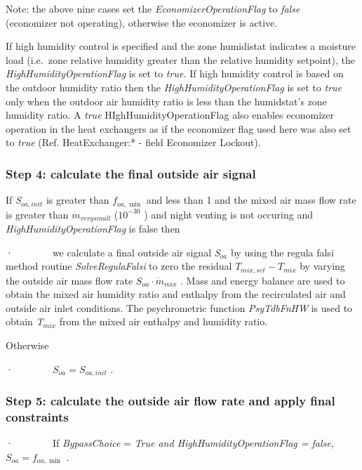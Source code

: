 Note: the above nine cases set the \emph{EconomizerOperationFlag} to \emph{false}~~~~~~ (economizer not operating), otherwise the economizer is active.

If high humidity control is specified and the zone humidistat indicates a moisture load (i.e.~zone relative humidity greater than the relative humidity setpoint), the \emph{HighHumidityOperationFlag} is set to \emph{true.} If high humidity control is based on the outdoor humidity ratio then the \emph{HighHumidityOperationFlag} is set to \emph{true} only when the outdoor air humidity ratio is less than the humidstat's zone humidity ratio. A \emph{true} HIghHumidityOperationFlag also enables economizer operation in the heat exchangers as if the economizer flag used here was also set to \emph{true} (Ref. HeatExchanger:* - field Economizer Lockout).

\subsubsection{Step 4: calculate the final outside air signal}\label{step-4-calculate-the-final-outside-air-signal}

If \emph{S\(_{oa,init}\)} is greater than \({f_{oa,\min }}\) and less than 1 and the mixed air mass flow rate is greater than \({\dot m_{verysmall}}\) (\({10^{ - 30}}\) ) and night venting is not occuring and \emph{HighHumidityOperationFlag} is false then

·~~~~~~~~we calculate a final outside air signal \emph{S\(_{oa}\)} by using the regula falsi method routine \emph{SolveRegulaFalsi} to zero the residual \({T_{mix,set}} - {T_{mix}}\) by varying the outside air mass flow rate \({S_{oa}}\cdot {\dot m_{mix}}\) . Mass and energy balance are used to obtain the mixed air humidity ratio and enthalpy from the recirculated air and outside air inlet conditions. The psychrometric function \emph{PsyTdbFnHW} is used to obtain \emph{T\(_{mix}\)} from the mixed air enthalpy and humidity ratio.

Otherwise

·~~~~~~~~\({S_{oa}} = {S_{oa,init}}\) .

\subsubsection{Step 5: calculate the outside air flow rate and apply final constraints}\label{step-5-calculate-the-outside-air-flow-rate-and-apply-final-constraints}

·~~~~~~~~If \emph{BypassChoice} = \emph{True and HighHumidityOperationFlag = false}, \({S_{oa}} = {f_{oa,\min }}\) .

